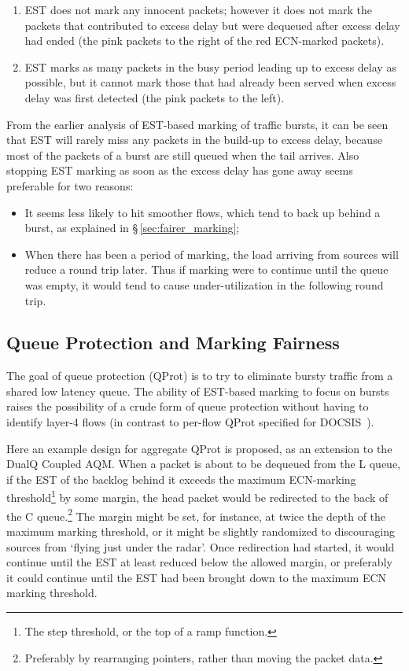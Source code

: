 \begin{enumerate}[nosep, label=Q\arabic*.]
	\item EST does not mark any innocent packets; however it does not mark the packets that contributed to excess delay but were dequeued after excess delay had ended (the pink packets to the right of the red ECN-marked packets). 
	\item EST marks as many packets in the busy period leading up to excess delay as possible, but it cannot mark those that had already been served when excess delay was first detected (the pink packets to the left).
\end{enumerate}
From the earlier analysis of EST-based marking of traffic bursts, it can be seen that EST will rarely miss any packets in the build-up to excess delay, because most of the packets of a burst are still queued when the tail arrives. Also stopping EST marking as soon as the excess delay has gone away seems preferable for two reasons:
\begin{itemize}
	\item It seems less likely to hit smoother flows, which tend to back up behind a burst, as explained in \S\,\ref{sec:fairer_marking};
	\item When there has been a period of marking, the load arriving from sources will reduce a round trip later. Thus if marking were to continue until the queue was empty, it would tend to cause under-utilization in the following round trip.
\end{itemize}

\subsection{Queue Protection and Marking Fairness}\label{sec:qprot_marking_fairness}

The goal of queue protection (QProt) is to try to eliminate bursty traffic from a shared low latency queue. The ability of EST-based marking to focus on bursts raises the possibility of a crude form of queue protection without having to identify layer-4 flows (in contrast to per-flow QProt specified for DOCSIS~\cite{Briscoe19b:q-prot_ID}).

Here an example design for aggregate QProt is proposed, as an extension to the DualQ Coupled AQM. When a packet is about to be dequeued from the L queue, if the EST of the backlog behind it exceeds the maximum ECN-marking threshold\footnote{The step threshold, or the top of a ramp function.} by some margin, the head packet would be redirected to the back of the C queue.\footnote{Preferably by rearranging pointers, rather than moving the packet data.} The margin might be set, for instance, at twice the depth of the maximum marking threshold, or it might be slightly randomized to discouraging sources from `flying just under the radar'. Once redirection had started, it would continue until the EST at least reduced below the allowed margin, or preferably it could continue until the EST had been brought down to the maximum ECN marking threshold. 

